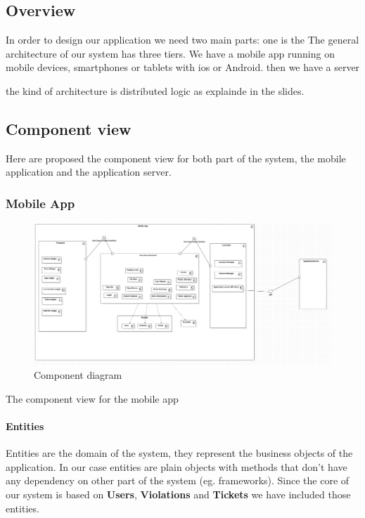 \subsection{Overview}

In order to design our application we need two main parts: one is the
The general architecture of our system has three tiers.
We have a mobile app running on mobile devices, smartphones or tablets with ios or Android.
then we have a server

the kind of architecture is distributed logic as explainde in the slides.


\subsection{Component view}

Here are proposed the component view for both part of the system, the mobile application and the application server.


\subsubsection{Mobile App}
\begin{figure}
\centering
\includegraphics[width=\textwidth]{Images/ComponentDiagram1.png}
\caption{\label{fig:compdiag} Component diagram}
\end{figure}

The component view for the mobile app

\paragraph{Entities}
Entities are the domain of the system, they represent the business objects of the application. In our case entities are plain objects with methods that don't have any dependency on other part of the system (eg. frameworks).
Since the core of our system is based on \textbf{Users}, \textbf{Violations} and \textbf{Tickets} we have included those entities.

